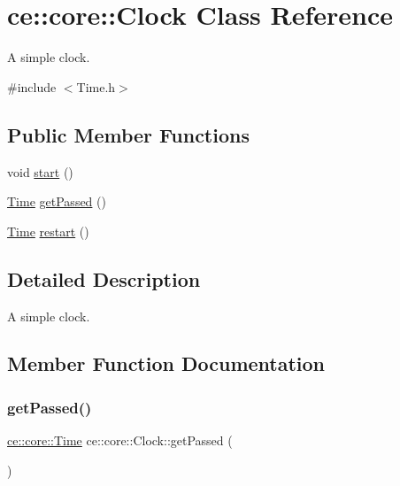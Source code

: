 \hypertarget{classce_1_1core_1_1_clock}{}\section{ce\+:\+:core\+:\+:Clock Class Reference}
\label{classce_1_1core_1_1_clock}


A simple clock.  




{\ttfamily \#include $<$Time.\+h$>$}

\subsection*{Public Member Functions}
\begin{DoxyCompactItemize}
\item 
void \hyperlink{classce_1_1core_1_1_clock_ae8ba6571cfacee77bf76e795969f772a}{start} ()
\item 
\hyperlink{structce_1_1core_1_1_time}{Time} \hyperlink{classce_1_1core_1_1_clock_a9aa3876753067768323f2c260c124a77}{get\+Passed} ()
\item 
\hyperlink{structce_1_1core_1_1_time}{Time} \hyperlink{classce_1_1core_1_1_clock_ad2f5f8ff6d8881ccd8626249232be0f2}{restart} ()
\end{DoxyCompactItemize}


\subsection{Detailed Description}
A simple clock. 

\subsection{Member Function Documentation}
\mbox{\label{classce_1_1core_1_1_clock_a9aa3876753067768323f2c260c124a77}} 
\subsubsection{\texorpdfstring{get\+Passed()}{getPassed()}}
{\footnotesize\ttfamily \hyperlink{structce_1_1core_1_1_time}{ce\+::core\+::\+Time} ce\+::core\+::\+Clock\+::get\+Passed (\begin{DoxyParamCaption}{ }\end{DoxyParamCaption})}

